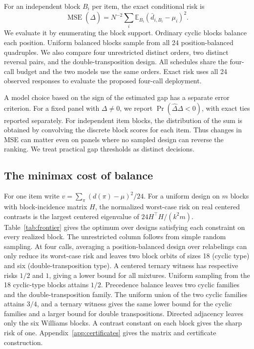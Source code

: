 \documentclass{article}
\begin{document}
For an independent block \(B_i\) per item, the exact conditional risk is
\begin{equation}
\operatorname{MSE}(\widehat\Delta)=
N^{-2}\sum_i \mathbb E_{B_i}(\bar d_{i,B_i}-\mu_i)^2.
\label{eq:risk}
\end{equation}
We evaluate it by enumerating the block support. Ordinary cyclic
blocks balance each position. Uniform balanced blocks sample from all 24
position-balanced quadruples. We also compare four unrestricted distinct
orders, two distinct reversal pairs, and the double-transposition design.
All schedules share the four-call budget and the two models use the same
orders. Exact risk uses all 24 observed responses to evaluate the
proposed four-call deployment.

A model choice based on the sign of the estimated gap has a separate
error criterion. For a fixed panel with $\Delta\ne 0$, we report
$\Pr(\widehat\Delta\Delta<0)$, with exact ties reported separately.
For independent item blocks, the distribution of the sum is obtained
by convolving the discrete block scores for each item. Thus changes in
MSE can matter even on panels where no sampled design can reverse the
ranking. We treat practical gap thresholds as distinct decisions.

\subsection{The minimax cost of balance}
For one item write \(v=\sum_\pi(d(\pi)-\mu)^2/24\). For a uniform
design on \(m\) blocks with block-incidence matrix \(H\), the normalized
worst-case risk on real centered contrasts is the largest centered
eigenvalue of \(24H^\top H/(k^2m)\).
Table~\ref{tab:frontier} gives the optimum over designs satisfying each
constraint on every realized block. The unrestricted column follows from
simple random sampling. At four calls, averaging a position-balanced design
over relabelings can only reduce its worst-case risk and leaves two
block orbits of sizes 18 (cyclic type) and six (double-transposition type).
A centered ternary witness has respective risks \(1/2\) and \(1\),
giving a lower bound for all mixtures. Uniform sampling from the 18
cyclic-type blocks attains \(1/2\).
Precedence balance leaves two cyclic families and the double-transposition family. The
uniform union of the two cyclic families attains \(3/4\), and a ternary witness gives the same
lower bound for the cyclic families and a larger bound for double transpositions. Directed adjacency leaves only the six
Williams blocks. A contrast constant on each block
gives the sharp risk of one. Appendix~\ref{app:certificates} gives the
matrix and certificate construction.
\end{document}
